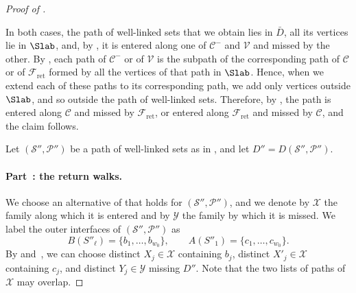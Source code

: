 \documentclass[fontsize=12pt,leading=14pt]{fullpaper}
\newcommand{\Ccal}{\mathcal{C}}
\newcommand{\Fcal}{\mathcal{F}}
\newcommand{\Pcal}{\mathcal{P}}
\newcommand{\Scal}{\mathcal{S}}
\newcommand{\Vcal}{\mathcal{V}}
\newcommand{\Xcal}{\mathcal{X}}
\newcommand{\Ycal}{\mathcal{Y}}
\newcounter{step}
\newcounter{proofstep}[section]
\newcommand{\proofstep}[2]{%
\paragraph*{\refstepcounter{proofstep}\label{#1}Part~\theproofstep: #2}}
\begin{document}
\begin{proof}[Proof of ]
\begin{cproof}
    In both cases, the path of well-linked sets that we obtain lies in $\bar D$, all its vertices lie in $\Slab$, and, by , it is entered along one of $\Ccal^-$ and $\Vcal$ and missed by the other.
    By , each path of $\Ccal^-$ or of $\Vcal$ is the subpath of the corresponding path of $\Ccal$ or of $\Fcal_{\mathrm{ret}}$ formed by all the vertices of that path in $\Slab$.
    Hence, when we extend each of these paths to its corresponding path, we add only vertices outside $\Slab$, and so outside the path of well-linked sets.
    Therefore, by , the path is entered along $\Ccal$ and missed by $\Fcal_{\mathrm{ret}}$, or entered along $\Fcal_{\mathrm{ret}}$ and missed by $\Ccal$, and the claim follows.
  \end{cproof}

  Let $(\Scal'',\Pcal'')$ be a path of well-linked sets as in , and let $D''=D(\Scal'',\Pcal'')$.

  \proofstep{part:closing-2}{the return walks.}
  We choose an alternative of  that holds for $(\Scal'',\Pcal'')$, and we denote by $\Xcal$ the family along which it is entered and by $\Ycal$ the family by which it is missed.
  We label the outer interfaces of $(\Scal'',\Pcal'')$ as
  \[
    B(S''_\ell)=\{b_1,\dots,b_{w_0}\},\qquad A(S''_1)=\{c_1,\dots,c_{w_0}\}.
  \]
  By  and~, we can choose distinct $X_j\in\Xcal$ containing $b_j$, distinct $X'_j\in\Xcal$ containing $c_j$, and distinct $Y_j\in\Ycal$ missing $D''$.
  Note that the two lists of paths of $\Xcal$ may overlap.


\end{proof}
\end{document}
